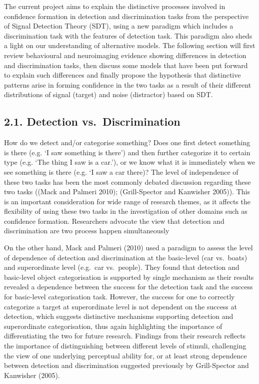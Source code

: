 \documentclass[]{article}
\begin{document}
The current project aims to explain the distinctive processes involved
in confidence formation in detection and discrimination tasks from the
perspective of Signal Detection Theory (SDT), using a new paradigm which
includes a discrimination task with the features of detection task. This
paradigm also sheds a light on our understanding of alternative models.
The following section will first review behavioural and neuroimaging
evidence showing differences in detection and discrimination tasks, then
discuss some models that have been put forward to explain such
differences and finally propose the hypothesis that distinctive patterns
arise in forming confidence in the two tasks as a result of their
different distributions of signal (target) and noise (distractor) based
on SDT.

\hypertarget{detection-vs.discrimination}{%
\subsection{2.1. Detection
vs.~Discrimination}\label{detection-vs.discrimination}}

How do we detect and/or categorise something? Does one first detect
something is there (e.g. `I saw something is there') and then further
categorize it to certain type (e.g. `The thing I saw is a car.'), or we
know what it is immediately when we see something is there (e.g. `I saw
a car there)? The level of independence of these two tasks has been the
most commonly debated discussion regarding these two tasks ((Mack and
Palmeri 2010); (Grill-Spector and Kanwisher 2005)). This is an important
consideration for wide range of research themes, as it affects the
flexibility of using these two tasks in the investigation of other
domains such as confidence formation. Researchers advocate the view that
detection and discrimination are two process happen simultaneously

On the other hand, Mack and Palmeri (2010) used a paradigm to assess the
level of dependence of detection and discrimination at the basic-level
(car vs.~boats) and superordinate level (e.g.~car vs.~people). They
found that detection and basic-level object categorisation is supported
by single mechanism as their results revealed a dependence between the
success for the detection task and the success for basic-level
categorisation task. However, the success for one to correctly
categorize a target at superordinate level is not dependent on the
success at detection, which suggests distinctive mechanisms supporting
detection and superordinate categorisation, thus again highlighting the
importance of differentiating the two for future research. Findings from
their research reflects the importance of distinguishing between
different levels of stimuli, challenging the view of one underlying
perceptual ability for, or at least strong dependence between detection
and discrimination suggested previously by Grill-Spector and Kanwisher
(2005).
\end{document}
